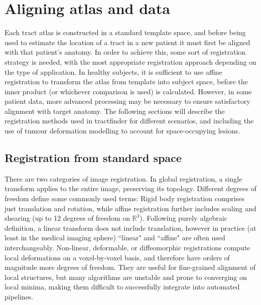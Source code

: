 \chapter{Aligning atlas and data}
\label{chap:reg}

Each tract atlas is constructed in a standard template space, and before being used to estimate the location of a tract in a new patient it must first be aligned with that patient's anatomy.
In order to achieve this, some sort of registration strategy is needed, with the most appropriate registration approach depending on the type of application.
In healthy subjects, it is sufficient to use affine registration to transform the atlas from template into subject space, before the inner product (or whichever comparison is used) is calculated.
However, in some patient data, more advanced processing may be necessary to ensure satisfactory alignment with target anatomy.
The following sections will describe the registration methods used in tractfinder for different scenarios, and including the use of tumour deformation modelling to account for space-occupying lesions.

\section{Registration from standard space}
\label{sec:reg1}

There are two categories of image registration.
In global registration, a single transform applies to the entire image, preserving its topology.
Different degrees of freedom define some commonly used terms:
Rigid body registration comprises just translation and rotation, while affine registration further includes scaling and shearing (up to 12 degrees of freedom on $\mathbb{R}^3$).
Following purely algebraic definition, a linear transform does not include translation, however in practice (at least in the medical imaging sphere) ``linear" and ``affine" are often used interchangeably.
Non-linear, deformable, or diffeomorphic registrations compute local deformations on a voxel-by-voxel basis, and therefore have orders of magnitude more degrees of freedom.
They are useful for fine-grained alignment of local structures, but many algorithms are unstable and prone to converging on local minima, making them difficult to successfully integrate into automated pipelines.

